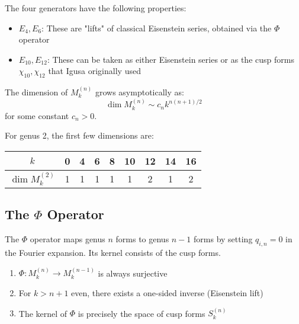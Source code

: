 The four generators have the following properties:

\begin{itemize}
\item $E_4, E_6$: These are "lifts" of classical Eisenstein series, obtained via the $\Phi$ operator
\item $E_{10}, E_{12}$: These can be taken as either Eisenstein series or as the cusp forms $\chi_{10}, \chi_{12}$ that Igusa originally used
\end{itemize}

\begin{theorem}
\label{thm:dimension_formula}
The dimension of $M_k^{(n)}$ grows asymptotically as:
\begin{equation}
\dim M_k^{(n)} \sim c_n k^{n(n+1)/2}
\label{eq:dimension_growth}
\end{equation}
for some constant $c_n > 0$.
\end{theorem}

For genus 2, the first few dimensions are:
\begin{center}
\begin{tabular}{|c|c|c|c|c|c|c|c|c|}
\hline
$k$ & 0 & 4 & 6 & 8 & 10 & 12 & 14 & 16 \\
\hline
$\dim M_k^{(2)}$ & 1 & 1 & 1 & 1 & 1 & 2 & 1 & 2 \\
\hline
\end{tabular}
\end{center}

\subsection{The $\Phi$ Operator}

\begin{definition}
\label{def:phi_operator}
The $\Phi$ operator maps genus $n$ forms to genus $n-1$ forms by setting $q_{i,n} = 0$ in the Fourier expansion. Its kernel consists of the cusp forms.
\end{definition}

\begin{theorem}
\label{thm:phi_properties}
\begin{enumerate}
\item $\Phi: M_k^{(n)} \to M_k^{(n-1)}$ is always surjective
\item For $k > n+1$ even, there exists a one-sided inverse (Eisenstein lift)
\item The kernel of $\Phi$ is precisely the space of cusp forms $S_k^{(n)}$
\end{enumerate}
\end{theorem}

